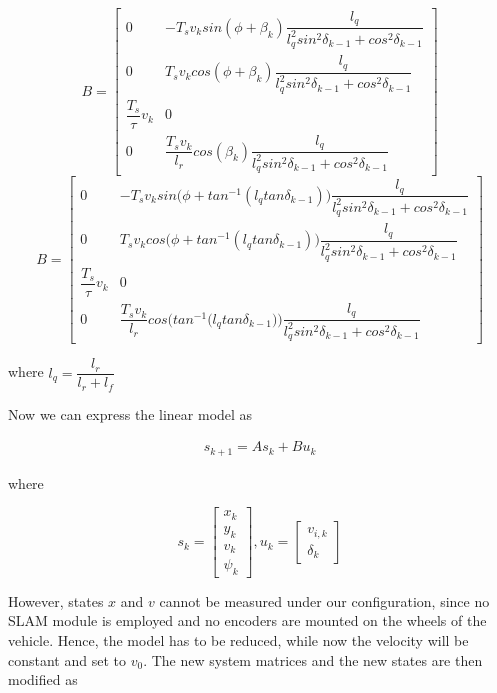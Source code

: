\begin{equation}
 B =
  \begin{bmatrix}
    0 & -T_s v_k sin(\phi + \beta_k) \dfrac{l_q}{l_q^2 sin^2\delta_{k-1} + cos^2\delta_{k-1}} \\
    0 & T_s v_k cos(\phi + \beta_k) \dfrac{l_q}{l_q^2 sin^2\delta_{k-1} + cos^2\delta_{k-1}} \\
    \dfrac{T_s}{\tau} v_k & 0 \\
    0 & \dfrac{T_s v_k}{l_r} cos(\beta_k) \dfrac{l_q}{l_q^2 sin^2\delta_{k-1} + cos^2\delta_{k-1}}
  \end{bmatrix}
\end{equation}
\begin{equation}
  B =
  \begin{bmatrix}
    0 & -T_s v_k sin\Big(\phi + tan^{-1} (l_q tan\delta_{k-1})\Big) \dfrac{l_q}{l_q^2 sin^2\delta_{k-1} + cos^2\delta_{k-1}} \\
    0 & T_s v_k cos\Big(\phi + tan^{-1} (l_q tan\delta_{k-1})\Big) \dfrac{l_q}{l_q^2 sin^2\delta_{k-1} + cos^2\delta_{k-1}} \\
    \dfrac{T_s}{\tau} v_k & 0 \\
    0 & \dfrac{T_s v_k}{l_r} cos\Bigg(tan^{-1} \Big(l_q tan\delta_{k-1}\Big)\Bigg) \dfrac{l_q}{l_q^2 sin^2\delta_{k-1} + cos^2\delta_{k-1}}
  \end{bmatrix}
\end{equation}


where $l_q = \dfrac{l_r}{l_r + l_f}$


Now we can express the linear model as

\begin{align}
  s_{k+1} = A s_k + B u_k
\end{align}

where

\begin{equation}
  s_k=
  \begin{bmatrix}
    x_{k} \\
    y_{k} \\
    v_{k} \\
    \psi_{k}
  \end{bmatrix},
  u_k=
  \begin{bmatrix}
    v_{i,k} \\
    \delta_{k}
  \end{bmatrix}
\end{equation}


However, states $x$ and $v$ cannot be measured under our configuration, since
no SLAM module is employed and no encoders are mounted on the wheels of the
vehicle. Hence, the model has to be reduced, while now the velocity will be
constant and set to $v_0$. The new system matrices and the new states are then
modified as



